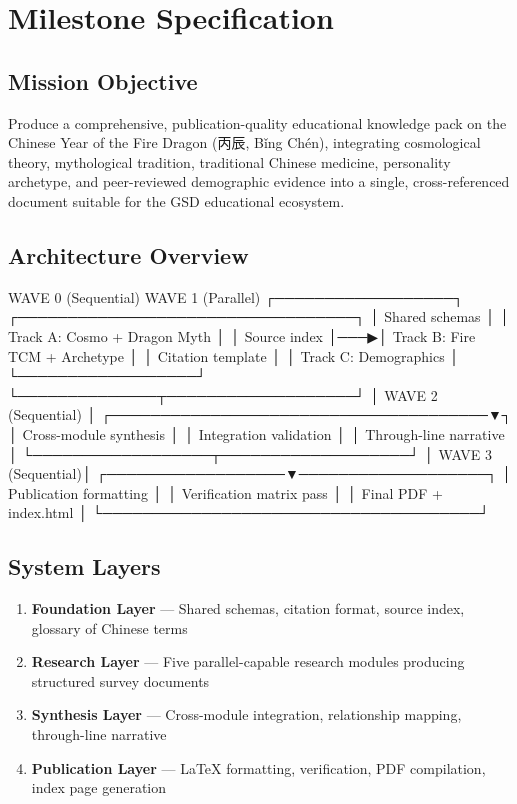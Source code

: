 \documentclass[11pt,letterpaper]{article}
\begin{document}
\section{Milestone Specification}

\subsection{Mission Objective}

Produce a comprehensive, publication-quality educational knowledge pack on the Chinese Year of the Fire Dragon (丙辰, Bǐng Chén), integrating cosmological theory, mythological tradition, traditional Chinese medicine, personality archetype, and peer-reviewed demographic evidence into a single, cross-referenced document suitable for the GSD educational ecosystem.

\subsection{Architecture Overview}

\begin{asciibox}
  WAVE 0 (Sequential)          WAVE 1 (Parallel)
  ┌──────────────────┐    ┌──────────────────────────────────┐
  │ Shared schemas   │    │ Track A: Cosmo + Dragon Myth     │
  │ Source index      │───▶│ Track B: Fire TCM + Archetype    │
  │ Citation template │    │ Track C: Demographics            │
  └──────────────────┘    └──────────────┬───────────────────┘
                                         │
  WAVE 2 (Sequential)                    │
  ┌──────────────────────────────────────▼┐
  │ Cross-module synthesis                │
  │ Integration validation                │
  │ Through-line narrative                │
  └──────────────────┬───────────────────┘
                     │
  WAVE 3 (Sequential)│
  ┌──────────────────▼───────────────────┐
  │ Publication formatting               │
  │ Verification matrix pass             │
  │ Final PDF + index.html               │
  └──────────────────────────────────────┘
\end{asciibox}

\subsection{System Layers}

\begin{enumerate}[leftmargin=2em]
\item \textbf{Foundation Layer} --- Shared schemas, citation format, source index, glossary of Chinese terms
\item \textbf{Research Layer} --- Five parallel-capable research modules producing structured survey documents
\item \textbf{Synthesis Layer} --- Cross-module integration, relationship mapping, through-line narrative
\item \textbf{Publication Layer} --- LaTeX formatting, verification, PDF compilation, index page generation
\end{enumerate}
\end{document}
